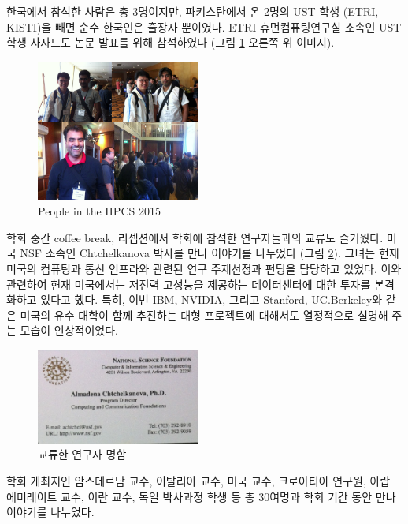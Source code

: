 \documentclass[twocolumn]{article}
\begin{document}
한국에서 참석한 사람은 총 3명이지만, 파키스탄에서 온 2명의 UST 학생 (ETRI, KISTI)을 빼면 순수 한국인은 출장자 뿐이였다. ETRI 휴먼컴퓨팅연구실 소속인 UST 학생 사자드도 논문 발표를 위해 참석하였다 (그림 \ref{fig:people} 오른쪽 위 이미지).

\begin{figure}[htb]
        \centering
        \includegraphics[width=0.48\textwidth]{people.png}
        \caption{People in the HPCS 2015}
        \label{fig:people}
\end{figure}

학회 중간 coffee break, 리셉션에서 학회에 참석한 연구자들과의 교류도 즐거웠다. 미국 NSF 소속인 Chtchelkanova 박사를 만나 이야기를 나누었다 (그림 \ref{fig:namecards00}). 그녀는 현재 미국의 컴퓨팅과 통신 인프라와 관련된 연구 주제선정과 펀딩을 담당하고 있었다. 이와 관련하여 현재 미국에서는 저전력 고성능을 제공하는 데이터센터에 대한 투자를 본격화하고 있다고 했다. 특히, 이번 IBM, NVIDIA, 그리고 Stanford, UC.Berkeley와 같은 미국의 유수 대학이 함께 추진하는 대형 프로젝트에 대해서도 열정적으로 설명해 주는 모습이 인상적이었다.
\begin{figure}[htb]
        \centering
        \includegraphics[width=0.48\textwidth]{nc01.png}
        \caption{교류한 연구자 명함}
        \label{fig:namecards00}
\end{figure}

학회 개최지인 암스테르담 교수, 이탈리아 교수, 미국 교수, 크로아티아 연구원, 아랍 에미레이트 교수, 이란 교수, 독일 박사과정 학생 등 총 30여명과 학회 기간 동안 만나 이야기를 나누었다.
\end{document}
